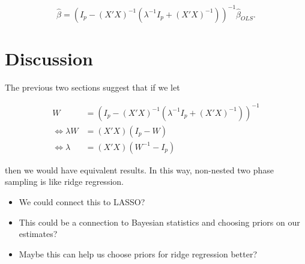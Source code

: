 \documentclass[12pt]{article}
\begin{document}
$$\hat \beta = (I_p - (X'X)^{-1}(\lambda^{-1}I_p + (X'X)^{-1}))^{-1} \hat \beta_{OLS}.$$

\section{Discussion}

The previous two sections suggest that if we let

$$
\begin{aligned}
  W &= (I_p - (X'X)^{-1}(\lambda^{-1}I_p + (X'X)^{-1}))^{-1} \\
  \iff \lambda W &= (X'X)(I_p - W) \\ 
  \iff \lambda &= (X'X)(W^{-1} - I_p)
\end{aligned}
$$

then we would have equivalent results. In this way, non-nested two phase
sampling is like ridge regression.

\begin{itemize}
  \item We could connect this to LASSO?
  \item This could be a connection to Bayesian statistics and choosing priors on
    our estimates?
  \item Maybe this can help us choose priors for ridge regression better?
\end{itemize}
\end{document}
